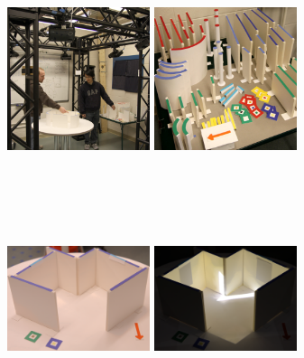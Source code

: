 \documentclass[review]{vgtc}                 %
\begin{document}
\begin{figure}[t]
  \centering
  \includegraphics[width=1.65in]{images/photos/josh_jonathan_new_contraption}
  \includegraphics[width=1.65in]{images/photos/available_wall_pieces}\vspace{-0.19in}\\
\begin{minipage}{1.65in}~{\color{white}{\bf a)}}\end{minipage}
\begin{minipage}{1.65in}~{\color{white}{\bf b)}}\end{minipage}\vspace{0.05in}\\
  \includegraphics[width=1.65in]{images/photos/sample_model}
  \includegraphics[width=1.65in]{images/photos/sample_rendering}\vspace{-0.19in}\\
\begin{minipage}{1.65in}~{\color{black}{\bf c)}}\end{minipage}

\end{figure}
\end{document}
